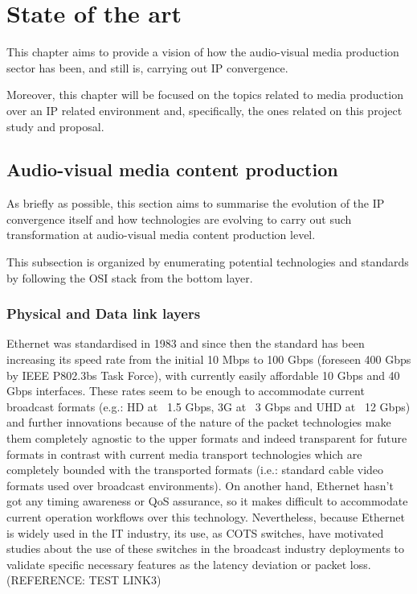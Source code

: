 \chapter{State of the art}\label{A:stateOfTheArt}

This chapter aims to provide a vision of how the audio-visual media production sector has been, and still is, carrying out IP convergence. 

Moreover, this chapter will be focused on the topics related to media production over an IP related environment and, specifically, the ones related on this project study and proposal.

\section{Audio-visual media content production}

As briefly as possible, this section aims to summarise the evolution of the IP convergence itself and how technologies are evolving to carry out such transformation at audio-visual media content production level.

This subsection is organized by enumerating potential technologies and standards by following the OSI stack from the bottom layer.

\subsection{Physical and Data link layers}

Ethernet was standardised in 1983 and since then the standard has been increasing its speed rate from the initial 10 Mbps to 100 Gbps (foreseen 400 Gbps by IEEE P802.3bs Task Force), with currently easily affordable 10 Gbps and 40 Gbps interfaces. These rates seem to be enough to accommodate current broadcast formats (e.g.: HD at ~1.5 Gbps, 3G at ~3 Gbps and UHD at ~12 Gbps) and further innovations because of the nature of the packet technologies make them completely agnostic to the upper formats and indeed transparent for future formats in contrast with current media transport technologies which are completely bounded with the transported formats (i.e.: standard cable video formats used over broadcast environments). On another hand, Ethernet hasn't got any timing awareness or QoS assurance, so it makes difficult to accommodate current operation workflows over this technology. Nevertheless, because Ethernet is widely used in the IT industry, its use, as COTS switches, have motivated studies about the use of these switches in the broadcast industry deployments to validate specific necessary features as the latency deviation or packet loss. (REFERENCE: TEST LINK3)

